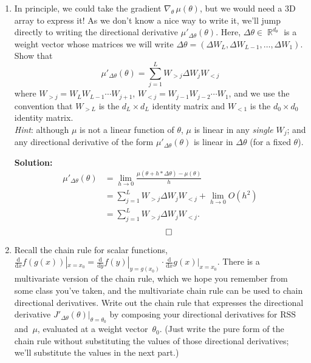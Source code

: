 \documentclass{article}
\DeclareMathOperator{\R}{\mathbb{R}}
\newenvironment{solution}{\color{blue} \smallskip \textbf{Solution:}}{}
\begin{document}
\begin{enumerate}
    Show how to write $\mathrm{RSS}'_{\Delta W}(W)$ as a Frobenius inner product of two matrices, one related to part 3.1.

    \begin{solution}
        \begin{align*}
            \mathrm{RSS}'_{\Delta W}(W) &= \lim_{h \to 0} \frac{\mathrm{RSS}(W + h * \Delta W) - \mathrm{RSS}(W)}{h}\\
            &= <\nabla_W \mathrm{RSS}(W), \Delta W>_F.
        \end{align*}
        \[ \qedhere \]
    \end{solution}

    \item
    In principle, we could take the gradient $\nabla_\theta \, \mu(\theta)$, but we would need a 3D array to express it!
    As we don't know a nice way to write it, we'll jump directly to writing the directional derivative $\mu'_{\Delta \theta}(\theta)$.
    Here, $\Delta \theta \in \R^{d_\theta}$ is a weight vector whose matrices we will write $\Delta \theta = (\Delta W_L, \Delta W_{L - 1}, \ldots, \Delta W_1)$.
    Show that
    \[
        \mu'_{\Delta \theta}(\theta) = \sum_{j=1}^L W_{>j} \Delta W_j W_{<j}
    \]
    where $W_{>j} = W_L W_{L-1} \cdots W_{j+1}$, $W_{<j} = W_{j-1} W_{j-2} \cdots W_1$, and we use the convention that $W_{>L}$ is the $d_L \times d_L$ identity matrix and $W_{<1}$ is the $d_0 \times d_0$ identity matrix. \\
    \textit{Hint}:  although $\mu$ is not a linear function of $\theta$, $\mu$ is linear in any {\em single} $W_j$; and any directional derivative of the form $\mu'_{\Delta \theta}(\theta)$ is linear in $\Delta \theta$ (for a fixed $\theta$).

    \begin{solution}
        \begin{align*}
            \mu'_{\Delta \theta}(\theta) &= \lim_{h \to 0} \frac{\mu(\theta + h*\Delta\theta) - \mu(\theta)}{h}\\
            &= \sum_{j=1}^L W_{>j} \Delta W_j W_{<j} + \lim_{h \to 0} O(h^2)\\
            &= \sum_{j=1}^L W_{>j} \Delta W_j W_{<j}.
        \end{align*}
        \[ \qedhere \]
    \end{solution}

    \item
    Recall the chain rule for scalar functions,
    $\frac{\mathrm{d}}{\mathrm{d}x} f(g(x))|_{x = x_0} =
    \frac{\mathrm{d}}{\mathrm{d}y} f(y)|_{y = g(x_0)} \cdot
    \frac{\mathrm{d}}{\mathrm{d}x} g(x)|_{x = x_0}$.
    There is a multivariate version of the chain rule, which we hope you remember from some class you've taken, and the multivariate chain rule can be used to chain directional derivatives.
    Write out the chain rule that expresses the directional derivative $J'_{\Delta \theta}(\theta)|_{\theta = \theta_0}$ by composing your directional derivatives for $\mathrm{RSS}$ and~$\mu$, evaluated at a weight vector~$\theta_0$.
    (Just write the pure form of the chain rule without substituting the values of those directional derivatives; we'll substitute the values in the next part.)


\end{enumerate}
\end{document}
